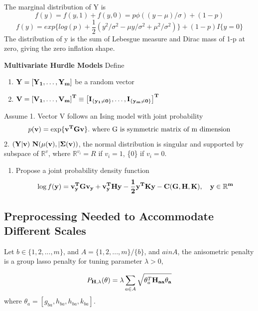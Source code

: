 \documentclass[
]{article}
\providecommand{\tightlist}{%
  \setlength{\itemsep}{0pt}\setlength{\parskip}{0pt}}
\begin{document}
The marginal distribution of Y is \[
f(y) = f(y, 1) + f(y, 0) = p \phi((y - \mu)/\sigma) + (1 - p)
\] \[
f(y) =  exp\{log(p) + \frac{1}{2}(y^2/\sigma^2 - \mu y/\sigma^2 + \mu^2/\sigma^2)\} + (1 - p) I\{y = 0\}
\] The distribution of y is the sum of Lebesgue measure and Dirac mass
of 1-p at zero, giving the zero inflation shape.

\textbf{Multivariate Hurdle Models} Define

\begin{enumerate}
\def\labelenumi{\arabic{enumi}.}
\tightlist
\item
  \(\bf{Y}=\left[Y_1, \ldots, Y_m\right]\) be a random vector
\item
  \(\bf{V}=\left[V_1, \ldots, V_m\right]^T \equiv\left[I_{\left\{y_1 \neq 0\right\}}, \ldots, I_{\left\{y_m \neq 0\right\}}\right]^T\)
\end{enumerate}

Assume 1. Vector V follows an Ising model with joint probability \[
p(\bf{v}) = \exp\{v^T G v\}. \text{ where G is symmetric matrix of m dimension}
\] 2. \(\bf (Y | v) ~ N(\mu(v), |\Sigma(v))\), the normal distribution
is singular and supported by subspace of \(\mathbb{R}^v\), where
\(\mathbb{R}^{v_i} = R\) if \(v_i = 1\), \{0\} if \(v_i = 0\).

\begin{enumerate}
\def\labelenumi{\arabic{enumi}.}
\setcounter{enumi}{2}
\tightlist
\item
  Propose a joint probability density function \[
   \log f(\bf{y})=\bf{v}_{\bf{y}}^T \bf{G} \bf{v}_{\bf{y}}+\bf{v}_{\bf{y}}^T \bf{H} \bf{y}-\frac{1}{2} \bf{y}^T \bf{K y}-C(\bf{G}, \bf{H}, \bf{K}), \quad \bf{y} \in \mathbb{R}^m
   \]
\end{enumerate}

\hypertarget{preprocessing-needed-to-accommodate-different-scales}{%
\subsection{Preprocessing Needed to Accommodate Different
Scales}\label{preprocessing-needed-to-accommodate-different-scales}}

Let \(b \in \{1,2, ..., m\}\), and \(A = \{1,2, ..., m\} / \{b \}\), and
\(a in A\), the anisometric penalty is a group lasso penalty for tuning
parameter \(\lambda > 0\),

\[
P_{\bf{H}, \lambda}(\theta)=\lambda \sum_{a \in A} \sqrt{\theta_a^T \bf{H}_{a a} \theta_a}
\] where \(θ_a = [g_{ba}, h_{ba}, h_{ba}, k_{ba}]\).
\end{document}
